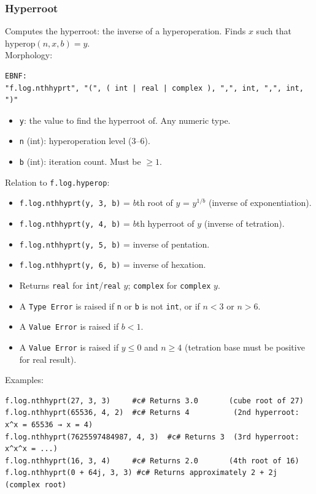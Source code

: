 \subsubsection{Hyperroot}
Computes the hyperroot: the inverse of a hyperoperation. Finds $x$ such that $\text{hyperop}(n, x, b) = y$.\\
Morphology:
\begin{verbatim}
EBNF:
"f.log.nthhyprt", "(", ( int | real | complex ), ",", int, ",", int, ")"
\end{verbatim}
\begin{itemize}
\item \texttt{y}: the value to find the hyperroot of. Any numeric type.
\item \texttt{n} (int): hyperoperation level (3--6).
\item \texttt{b} (int): iteration count. Must be $\geq 1$.
\end{itemize}

\noindent Relation to \texttt{f.log.hyperop}:
\begin{itemize}
\item \texttt{f.log.nthhyprt(y, 3, b)} = $b$th root of $y$ = $y^{1/b}$ (inverse of exponentiation).
\item \texttt{f.log.nthhyprt(y, 4, b)} = $b$th hyperroot of $y$ (inverse of tetration).
\item \texttt{f.log.nthhyprt(y, 5, b)} = inverse of pentation.
\item \texttt{f.log.nthhyprt(y, 6, b)} = inverse of hexation.
\end{itemize}

\begin{itemize}
\item Returns \texttt{real} for \texttt{int}/\texttt{real} $y$; \texttt{complex} for \texttt{complex} $y$.
\item A \texttt{Type Error} is raised if \texttt{n} or \texttt{b} is not \texttt{int}, or if $n < 3$ or $n > 6$.
\item A \texttt{Value Error} is raised if $b < 1$.
\item A \texttt{Value Error} is raised if $y \leq 0$ and $n \geq 4$ (tetration base must be positive for real result).
\end{itemize}

Examples:
\begin{verbatim}
f.log.nthhyprt(27, 3, 3)     #c# Returns 3.0       (cube root of 27)
f.log.nthhyprt(65536, 4, 2)  #c# Returns 4          (2nd hyperroot: x^x = 65536 → x = 4)
f.log.nthhyprt(7625597484987, 4, 3)  #c# Returns 3  (3rd hyperroot: x^x^x = ...)
f.log.nthhyprt(16, 3, 4)     #c# Returns 2.0       (4th root of 16)
f.log.nthhyprt(0 + 64j, 3, 3) #c# Returns approximately 2 + 2j  (complex root)
\end{verbatim}

